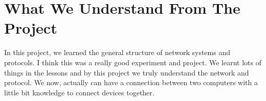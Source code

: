 \documentclass[conference]{IEEEtran}
\begin{document}
\section{What We Understand From The Project}

In this project, we learned the general structure of network systems and protocols. I think this was a really good experiment and project. We learnt lots of things in the lessons and by this project we truly understand the network and protocol. We now, actually can have a connection between two computers with a little bit knowledge to connect devices together. 
\end{document}
